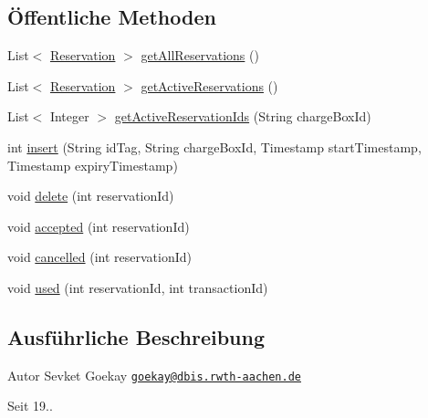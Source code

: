 \subsection*{Öffentliche Methoden}
\begin{DoxyCompactItemize}
\item 
List$<$ \hyperlink{classde_1_1rwth_1_1idsg_1_1steve_1_1repository_1_1dto_1_1_reservation}{Reservation} $>$ \hyperlink{interfacede_1_1rwth_1_1idsg_1_1steve_1_1repository_1_1_reservation_repository_a63479747f8994a75f3bed8e3f2fdc98b}{get\-All\-Reservations} ()
\item 
List$<$ \hyperlink{classde_1_1rwth_1_1idsg_1_1steve_1_1repository_1_1dto_1_1_reservation}{Reservation} $>$ \hyperlink{interfacede_1_1rwth_1_1idsg_1_1steve_1_1repository_1_1_reservation_repository_af8997fa4fe0a553d7aca41f413411a5a}{get\-Active\-Reservations} ()
\item 
List$<$ Integer $>$ \hyperlink{interfacede_1_1rwth_1_1idsg_1_1steve_1_1repository_1_1_reservation_repository_aefb53c3222e0d5f36e3aa7ac3a91b40c}{get\-Active\-Reservation\-Ids} (String charge\-Box\-Id)
\item 
int \hyperlink{interfacede_1_1rwth_1_1idsg_1_1steve_1_1repository_1_1_reservation_repository_a1b6efd9eba4355cbcf5f85479effaad6}{insert} (String id\-Tag, String charge\-Box\-Id, Timestamp start\-Timestamp, Timestamp expiry\-Timestamp)
\item 
void \hyperlink{interfacede_1_1rwth_1_1idsg_1_1steve_1_1repository_1_1_reservation_repository_a269c1973292847a6485237b4449a5f5c}{delete} (int reservation\-Id)
\item 
void \hyperlink{interfacede_1_1rwth_1_1idsg_1_1steve_1_1repository_1_1_reservation_repository_a839cd195bc1fa9893a32ac760b3353b0}{accepted} (int reservation\-Id)
\item 
void \hyperlink{interfacede_1_1rwth_1_1idsg_1_1steve_1_1repository_1_1_reservation_repository_a25403a1b68112eba0b41633addfa98ca}{cancelled} (int reservation\-Id)
\item 
void \hyperlink{interfacede_1_1rwth_1_1idsg_1_1steve_1_1repository_1_1_reservation_repository_a0e4c6205a4b4e61d9076401a36483d4e}{used} (int reservation\-Id, int transaction\-Id)
\end{DoxyCompactItemize}


\subsection{Ausführliche Beschreibung}
\begin{DoxyAuthor}{Autor}
Sevket Goekay \href{mailto:goekay@dbis.rwth-aachen.de}{\tt goekay@dbis.\-rwth-\/aachen.\-de} 
\end{DoxyAuthor}
\begin{DoxySince}{Seit}
19.. 
\end{DoxySince}


